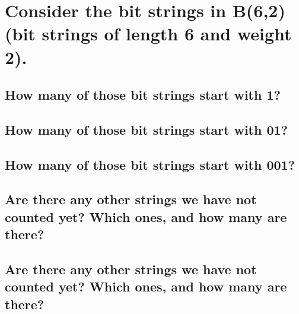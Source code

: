 \documentclass{article}
\begin{document}
\section{Consider the bit strings in B(6,2) (bit strings of length 6 and weight 2).}
\subsection{How many of those bit strings start with 1?}
\subsection{How many of those bit strings start with 01?}
\subsection{How many of those bit strings start with 001?}
\subsection{Are there any other strings we have not counted yet? Which ones, and how many are there?}
\subsection{Are there any other strings we have not counted yet? Which ones, and how many are there?}
\end{document}
